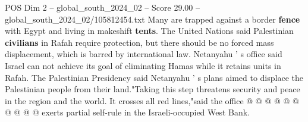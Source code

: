 \begin{textsample}{POS Dim 2 – global\_south\_2024\_02 – Score 29.00 – global\_south\_2024\_02/105812454.txt}
Many are trapped against a border \textbf{fence} with Egypt and living in makeshift \textbf{tents}.
The United Nations said Palestinian \textbf{civilians} in Rafah require protection, but there should be no forced mass displacement, which is barred by international law.
Netanyahu ' s office said Israel can not achieve its goal of eliminating Hamas while it retains units in Rafah.
The Palestinian Presidency said Netanyahu ' s plans aimed to displace the Palestinian people from their land."Taking this step threatens security and peace in the region and the world.
It crosses all red lines,"said the office @ @ @ @ @ @ @ @ @ @ exerts partial self-rule in the Israeli-occupied West Bank.

\end{textsample}
